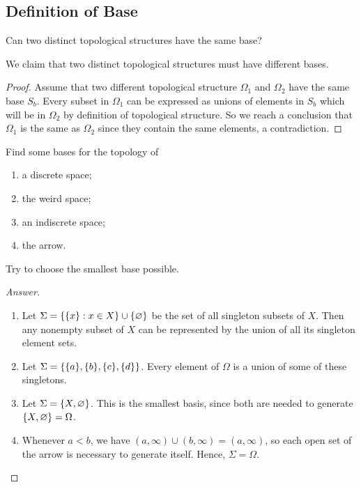 \subsection{Definition of Base}
\begin{minorEx} %
Can two distinct topological structures have the same base?
\end{minorEx}

We claim that two distinct topological structures must have different bases.

\begin{proof}
Assume that two different topological structure $\Omega_1$ and $\Omega_2$ have the same base $S_b$. Every subset in $\Omega_1$ can be expressed as unions of elements in $S_b$ which will be in $\Omega_2$ by definition of topological structure. So we reach a conclusion that $\Omega_1$ is the same as $\Omega_2$ since they contain the same elements, a contradiction.
\end{proof}

\begin{minorEx}
    Find some bases for the topology of
    \begin{enumerate}
        \item a discrete space;
        \item the weird space;
        \item an indiscrete space;
        \item the arrow.
    \end{enumerate}
    Try to choose the smallest base possible.
\end{minorEx}

\begin{proof}[Answer]
    \begin{enumerate}
        \item Let $\Sigma = \{\{x\} : x \in X\} \cup \{\varnothing\}$ be the set of all
            singleton subsets of $X$. Then any nonempty subset of $X$ can be
            represented by the union of all its singleton element sets.
        \item Let $\Sigma = \{\{a\}, \{b\}, \{c\}, \{d\}\}$. Every
            element of $\Omega$ is a union of some of these singletons.
        \item Let $\Sigma = \{X, \varnothing\}$. This is the smallest basis,
            since both are needed to generate $\{X, \varnothing\} = \Omega$.
        \item Whenever $a < b$, we have $(a, \infty) \cup (b, \infty) = (a,
            \infty)$, so each open set of the arrow is necessary to generate
            itself. Hence, $\Sigma = \Omega$.
    \end{enumerate}
\end{proof}

